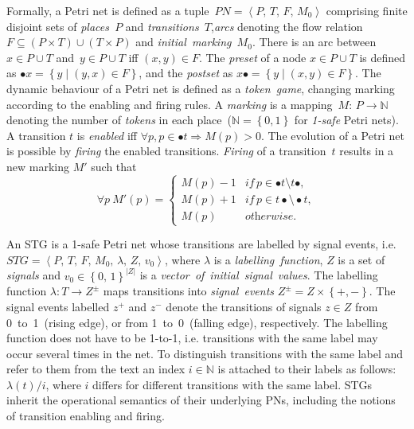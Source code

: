 \documentclass[british, journal]{IEEEtran}
\begin{document}
Formally, a Petri net is defined as a tuple~$PN=\left\langle P,\, T,\, F,\,
M_{0}\right\rangle $
comprising finite disjoint sets of \emph{places~}$P$ and \emph{transitions~}$T$,\emph{arcs} denoting the flow relation~$F\subseteq\left(P\times
T\right)\cup\left(T\times P\right)$
and \emph{initial~marking~}$M_{0}$. There is an arc between~$x\in P\cup T$
and~$y\in P\cup T$ iff $\left(x,y\right)\in F$. The \emph{preset}
of a node $x\in P\cup T$ is defined as $\bullet x=\left\{
y\mid\left(y,x\right)\in F\right\} $,
and the \emph{postset} as $x\bullet=\left\{ y\mid\left(x,y\right)\in F\right\}
$.
The dynamic behaviour of a Petri net is defined as a \emph{token~game},
changing marking according to the enabling and firing rules. A \emph{marking}
is a mapping~$M:\, P\rightarrow\mathbb{N}$ denoting the number of
\emph{tokens} in each place~($\mathbb{N}=\left\{ 0,1\right\} $ for
\emph{1-safe} Petri nets). A transition $t$ is \emph{enabled} iff
$\forall p,p\in\bullet t\Rightarrow M(p)>0$. The evolution of a Petri
net is possible by \emph{firing} the enabled transitions. \emph{Firing}
of a transition~$t$ results in a new marking $M'$ such that
\[
\forall p~M'(p)=\left\{ \begin{array}{ll}
M(p)-1 & \textit{if}\, p\in\bullet t\setminus t\bullet,\\
M(p)+1 & \textit{if}\, p\in t\bullet\setminus\bullet t,\\
M(p)\,\,\,\,\, & \textit{otherwise}.
\end{array}\right.
\]

An STG is a 1-safe Petri net whose transitions are labelled by signal
events, i.e. $STG=\left\langle P,\, T,\, F,\, M_{0},\,\lambda,\, Z,\,
v_{0}\right\rangle $,
where $\lambda$ is a \emph{labelling~function}, $Z$ is a set of
\emph{signals} and $v_{0}\in\left\{ 0,\,1\right\} ^{\left|Z\right|}$
is a \emph{vector~of}~\emph{initial~signal~values}. The labelling
function $\lambda:T\rightarrow Z^{\pm}$ maps transitions into
\emph{signal~events}
$Z^{\pm}=Z\times\left\{+,-\right\}$. The signal events labelled $z^{+}$
and $z^{-}$ denote the transitions of signals $z\in Z$ from 0~to~1~(rising
edge), or from 1~to~0~(falling edge), respectively. The labelling
function does not have to be 1-to-1, i.e. transitions with the same
label may occur several times in the net. To distinguish transitions
with the same label and refer to them from the text an index $i\in\mathbb{N}$
is attached to their labels as follows: $\lambda\left(t\right)/i$,
where $i$ differs for different transitions with the same label.
STGs inherit the operational semantics of their underlying PNs, including
the notions of transition enabling and firing.
\end{document}
